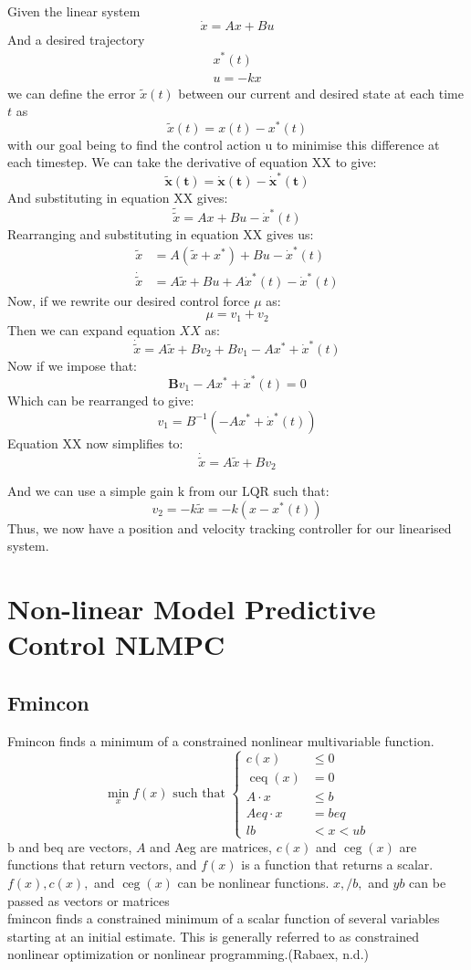 \documentclass{UoNMCHA}
\numberwithin{equation}{section}
\begin{document}
Given the linear system
$$
\dot{x}=A x+B u
$$
And a desired trajectory
$$
\begin{array}{c}
x^{*}(t) \\
u=-k x
\end{array}
$$
we can define the error $\tilde{x}(t)$ between our current and desired state at each time $t$ as
$$
\tilde{x}(t)=x(t)-x^{*}(t)
$$
with our goal being to find the control action u to minimise this difference at each timestep.
We can take the derivative of equation XX to give:
$$
\tilde{\boldsymbol{x}}(\boldsymbol{t})=\dot{\boldsymbol{x}}(\boldsymbol{t})-\dot{\boldsymbol{x}}^{*}(\boldsymbol{t})
$$
And substituting in equation XX gives:
$$
\tilde{\tilde{x}}=A x+B u-\dot{x}^{*}(t)
$$
Rearranging and substituting in equation XX gives us:
$$
\begin{aligned}
\tilde{x} &=A\left(\tilde{x}+x^{*}\right)+B u-\dot{x}^{*}(t) \\
\dot{\tilde{x}} &=A \tilde{x}+B u+A \dot{x}^{*}(t)-\dot{x}^{*}(t)
\end{aligned}
$$
Now, if we rewrite our desired control force $\mu$ as:
$$
\mu=v_{1}+v_{2}
$$
Then we can expand equation $X X$ as:
$$
\dot{\tilde{x}}=A \tilde{x}+B v_{2}+B v_{1}-A x^{*}+\dot{x}^{*}(t)
$$
Now if we impose that:
$$
\boldsymbol{B} v_{1}-A x^{*}+\dot{x}^{*}(t)=0
$$
Which can be rearranged to give:
$$
v_{1}=B^{-1}\left(-A x^{*}+\dot{x}^{*}(t)\right)
$$
Equation XX now simplifies to:
$$
\dot{\tilde{x}}=A \tilde{x}+B v_{2}
$$

And we can use a simple gain $\mathrm{k}$ from our $\mathrm{LQR}$ such that:
$$
v_{2}=-k \tilde{x}=-k\left(x-x^{*}(t)\right)
$$
Thus, we now have a position and velocity tracking controller for our linearised system.

\section{Non-linear Model Predictive Control NLMPC}

\subsection{Fmincon}
Fmincon finds a minimum of a constrained nonlinear multivariable function.
$$
\min _{x} f(x) \text { such that }\left\{\begin{aligned}
c(x) & \leq 0 \\
\operatorname{ceq}(x) &=0 \\
A \cdot x & \leq b \\
A e q \cdot x &=b e q \\
l b &<x<u b
\end{aligned}\right.
$$
$\mathrm{b}$ and beq are vectors, $A$ and Aeg are matrices, $c(x)$ and $\operatorname{ceg}(x)$ are functions that return vectors, and $f(x)$
is a function that returns a scalar. $f(x), c(x),$ and $\operatorname{ceg}(x)$ can be nonlinear functions. $x, / b,$ and $y b$ can be
passed as vectors or matrices\\
fmincon finds a constrained minimum of a scalar function of several variables starting at an initial
estimate. This is generally referred to as constrained nonlinear optimization or nonlinear programming.(Rabaex, n.d.)
\end{document}
